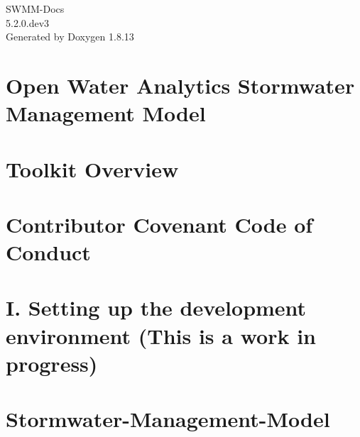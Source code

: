 \documentclass[twoside]{book}
\newcommand{\+}{\discretionary{\mbox{\scriptsize$\hookleftarrow$}}{}{}}
\newcommand{\clearemptydoublepage}{%
  \newpage{\pagestyle{empty}\cleardoublepage}%
}
\begin{document}
\hypersetup{pageanchor=false,
             bookmarksnumbered=true,
             pdfencoding=unicode
            }
\begin{titlepage}
\vspace*{7cm}
\begin{center}%
{\Large S\+W\+M\+M-\/\+Docs \\[1ex]\large 5.\+2.\+0.\+dev3 }\\
\vspace*{1cm}
{\large Generated by Doxygen 1.8.13}\\
\end{center}
\end{titlepage}
\clearemptydoublepage
{}
\tableofcontents
\clearemptydoublepage
{}
\hypersetup{pageanchor=true}

\chapter{Open Water Analytics Stormwater Management Model}
\label{index}\hypertarget{index}{}
\chapter{Toolkit Overview}
\label{toolkit-overview}

\chapter{Contributor Covenant Code of Conduct}
\label{md__c_1__p_r_o_j_e_c_t_c_o_d_e__stormwater-_management-_model__8github__c_o_d_e__o_f__c_o_n_d_u_c_t}

\chapter{I. Setting up the development environment (This is a work in progress)}
\label{md__c_1__p_r_o_j_e_c_t_c_o_d_e__stormwater-_management-_model__8github__c_o_n_t_r_i_b_u_t_i_n_g}

\chapter{Stormwater-\/\+Management-\/\+Model}
\label{md__c_1__p_r_o_j_e_c_t_c_o_d_e__stormwater-_management-_model__r_e_a_d_m_e}

\end{document}
